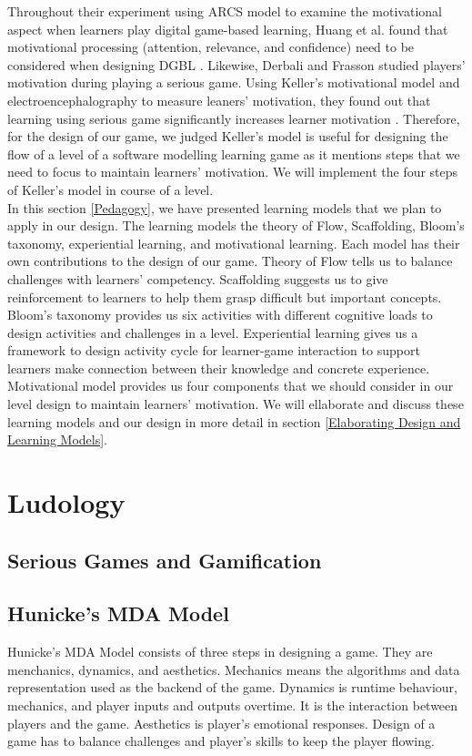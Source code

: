 \documentclass[12pt, a4paper]{report}
\begin{document}
Throughout their experiment using ARCS model to examine the motivational aspect when learners play digital game-based learning, Huang et al. found that motivational processing (attention, relevance, and confidence) need to be considered when designing DGBL \cite{huang2010sustaining}. Likewise, Derbali and Frasson studied players' motivation during playing a serious game. Using Keller's motivational model and  electroencephalography to measure leaners' motivation, they found out that learning using serious game significantly increases learner motivation \cite{derbali2010players}. Therefore, for the design of our game, we judged Keller's model is useful for designing the flow of a level of a software modelling learning game as it mentions steps that we need to focus to maintain learners' motivation. We will implement the four steps of Keller's model in course of a level.\\

In this section \ref{Pedagogy}, we have presented learning models that we plan to apply in our design. The learning models the theory of Flow, Scaffolding, Bloom's taxonomy, experiential learning, and motivational learning. Each model has their own contributions to the design of our game. Theory of Flow tells us to balance challenges with learners' competency. Scaffolding suggests us to give reinforcement to learners to help them grasp difficult but important concepts. Bloom's taxonomy provides us six activities with different cognitive loads to design activities and challenges in a level. Experiential learning gives us a framework to design activity cycle for learner-game interaction to support learners make connection between their knowledge and concrete experience. Motivational model provides us four components that we should consider in our level design to maintain learners' motivation. We will ellaborate and discuss these learning models and our design in more detail in section \ref{Elaborating Design and Learning Models}.    

\section{Ludology}

\subsection{Serious Games and Gamification}


\subsection{Hunicke's MDA Model}
Hunicke's MDA Model \cite{hunicke2004mda} consists of three steps in designing a game. They are menchanics, dynamics, and aesthetics. Mechanics means the algorithms and data representation used as the backend of the game. Dynamics is runtime behaviour, mechanics, and player inputs and outputs overtime. It is the interaction between players and the game. Aesthetics is player's emotional responses. Design of a  game has to balance challenges and player's skills to keep the player flowing.
\end{document}
